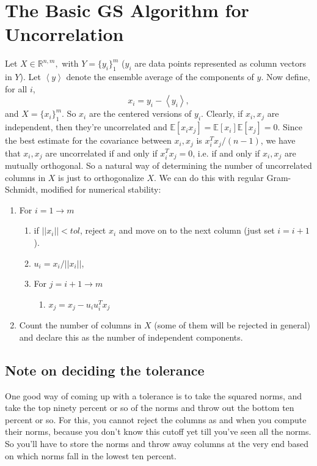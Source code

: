 \documentclass[reqno]{amsart}
\newcommand{\rl}{\mathbb{R}}
\newcommand{\E}[1]{\mathbb{E}\left[ #1 \right]}
\newcommand{\norm}[1]{\left| \left| #1 \right| \right|}
\newcommand{\mean}[1]{\left \langle #1 \right \rangle}
\begin{document}
\section{The Basic GS Algorithm for Uncorrelation}
Let $X \in \rl^{n, m},$ with $Y= \{ y_i \}_1 ^m$ ($y_i$ are data points represented as column vectors in $Y$). Let $\mean{y}$ denote the ensemble average of the components of $y$. Now define, for all $i$,
\[ x_i = y_i -  \mean{y_i}, \]
and $X = \{ x_i \}_1 ^m$.
So $x_i$ are the centered versions of $y_i$. Clearly, if $x_i, x_j$ are independent, then they're uncorrelated and $\E{x_i x_j} = \E{x_i} \E{x_j} = 0$. Since the best estimate for the covariance between $x_i, x_j$ is $x_i ^T x_j / (n-1)$, we have that $x_i, x_j$ are uncorrelated if and only if $x_i ^T x_j = 0$, i.e. if and only if $x_i, x_j$ are mutually orthogonal. So a natural way of determining the number of uncorrelated columns in $X$ is just to orthogonalize $X$. We can do this with regular Gram-Schmidt, modified for numerical stability:
\begin{enumerate}
\item For $i = 1 \to m$
\begin{enumerate}
\item if $\norm{x_i} < tol$, reject $x_i$ and move on to the next column (just set $i = i+1$).
\item $u_i = x_i / \norm{x_i}$,
\item For $j = i+1 \to m$
\begin{enumerate}
\item[] $x_j = x_j - u_i u_i ^T x_j$
\end{enumerate}
\end{enumerate}
\item Count the number of columns in $X$ (some of them will be rejected in general) and declare this as the number of independent components.
\end{enumerate}

\subsection{Note on deciding the tolerance}
One good way of coming up with a tolerance is to take the squared norms, and take the top ninety percent or so of the norms and throw out the bottom ten percent or so. For this, you cannot reject the columns as and when you compute their norms, because you don't know this cutoff yet till you've seen all the norms. So you'll have to store the norms and throw away columns at the very end based on which norms fall in the lowest ten percent.
\end{document}
